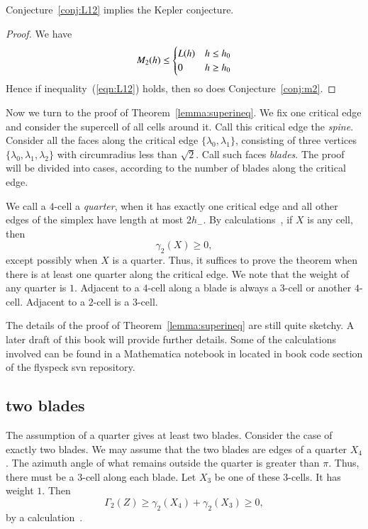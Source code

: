 \begin{corollary} 
Conjecture~\ref{conj:L12} implies the Kepler conjecture.
\end{corollary}

\begin{proof}
We have 
$$
 M_2(h) \le \begin{cases} L(h) & h \le {h_0}\\ 0 & h\ge {h_0} \end{cases}
$$
Hence if inequality~(\ref{eqn:L12}) holds, then so does Conjecture~\ref{conj:m2}.
\end{proof}



Now we turn to the proof of Theorem~\ref{lemma:superineq}. We fix one critical edge and consider the supercell of all cells around it.  Call this critical edge the {\it spine}.  Consider all the faces along the critical edge $\{\lambda_0,\lambda_1\}$, consisting of three vertices $\{\lambda_0,\lambda_1,\lambda_2\}$ with circumradius less than $\sqrt2$.  Call such faces {\it blades}.  The proof will be divided into cases, according to the number of blades along the critical edge.

We call a $4$-cell a {\it quarter}, when it has exactly one critical edge and all other edges of the simplex have length at most $2 h_-$. By calculations~\cite[cc:qtr:GLFVCVK]{hales:2009:nonlinear}, if $X$ is any cell, then %
$$
 \gamma_2(X) \ge 0,
$$ 
except possibly when $X$ is a quarter.  Thus, it
suffices to prove the theorem
when there is at least one quarter along the critical
edge.  We note that the weight of any quarter is $1$.
Adjacent to a $4$-cell along a blade is always a $3$-cell or another $4$-cell. Adjacent to a $2$-cell is a $3$-cell.

\begin{note}%
The details of the proof of Theorem~\ref{lemma:superineq} are still quite sketchy.  A later draft of this book will provide further details.  Some of the calculations involved can be found in a Mathematica notebook in located in book code section of the flyspeck svn repository.
\end{note}


\subsection{two blades}

The assumption of a quarter gives at least two blades.  Consider
the case of exactly two blades.
We may assume that the two blades are edges of a quarter
$X_4$. 
The azimuth angle of what remains outside the quarter
is greater than $\pi$.  Thus, there must be a $3$-cell
along each blade.  Let $X_3$ be one of these $3$-cells.
It has weight $1$.
Then 
\begin{equation}\label{eqn:34}
\Gamma_2(Z)\ge \gamma_2(X_4)+\gamma_2(X_3)\ge 0,
\end{equation}
by a calculation~\cite[cc:2bl:FHBVYXZ]{hales:2009:nonlinear}. %

